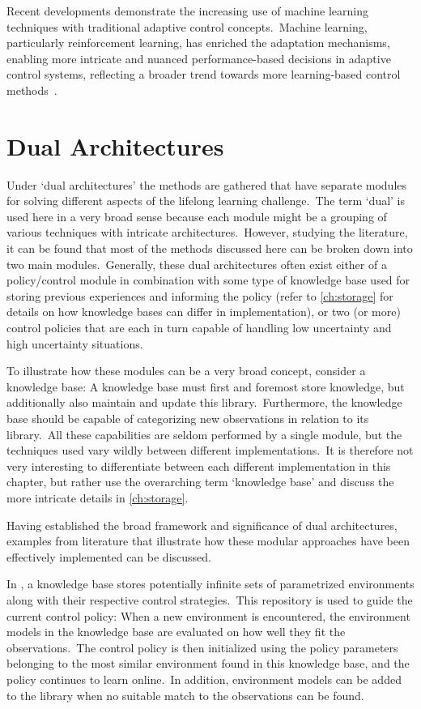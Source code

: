Recent developments demonstrate the increasing use of machine learning techniques with traditional adaptive control concepts.\ Machine learning, particularly reinforcement learning, has enriched the adaptation mechanisms, enabling more intricate and nuanced performance-based decisions in adaptive control systems, reflecting a broader trend towards more learning-based control methods~\cite[section 2]{Annaswamy2021}.


\section{Dual Architectures}\label{sec:dual}
Under `dual architectures' the methods are gathered that have separate modules for solving different aspects of the lifelong learning challenge.\ The term `dual' is used here in a very broad sense because each module might be a grouping of various techniques with intricate architectures.\ However, studying the literature, it can be found that most of the methods discussed here can be broken down into two main modules.\ Generally, these dual architectures often exist either of a policy/control module in combination with some type of knowledge base used for storing previous experiences and informing the policy (refer to \cref{ch:storage} for details on how knowledge bases can differ in implementation), or two (or more) control policies that are each in turn capable of handling low uncertainty and high uncertainty situations.

To illustrate how these modules can be a very broad concept, consider a knowledge base: A knowledge base must first and foremost store knowledge, but additionally also maintain and update this library.\ Furthermore, the knowledge base should be capable of categorizing new observations in relation to its library.\ All these capabilities are seldom performed by a single module, but the techniques used vary wildly between different implementations.\ It is therefore not very interesting to differentiate between each different implementation in this chapter, but rather use the overarching term `knowledge base' and discuss the more intricate details in \cref{ch:storage}.

Having established the broad framework and significance of dual architectures, examples from literature that illustrate how these modular approaches have been effectively implemented can be discussed.

In \textcite{Wang2022}, a knowledge base stores potentially infinite sets of parametrized environments along with their respective control strategies.\ This repository is used to guide the current control policy: When a new environment is encountered, the environment models in the knowledge base are evaluated on how well they fit the observations.\ The control policy is then initialized using the policy parameters belonging to the most similar environment found in this knowledge base, and the policy continues to learn online.\ In addition, environment models can be added to the library when no suitable match to the observations can be found.

